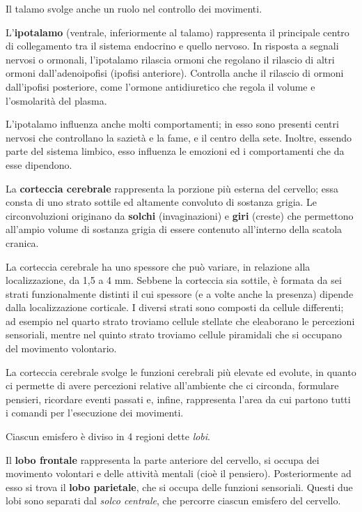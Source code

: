 \documentclass[]{article}
\begin{document}
Il talamo svolge anche un ruolo nel controllo dei movimenti.

L'\textbf{ipotalamo} (ventrale, inferiormente al talamo) rappresenta il
principale centro di collegamento tra il sistema endocrino e quello
nervoso. In risposta a segnali nervosi o ormonali, l'ipotalamo rilascia
ormoni che regolano il rilascio di altri ormoni dall'adenoipofisi
(ipofisi anteriore). Controlla anche il rilascio di ormoni dall'ipofisi
posteriore, come l'ormone antidiuretico che regola il volume e
l'osmolarità del plasma.

L'ipotalamo influenza anche molti comportamenti; in esso sono presenti
centri nervosi che controllano la sazietà e la fame, e il centro della
sete. Inoltre, essendo parte del sistema limbico, esso influenza le
emozioni ed i comportamenti che da esse dipendono.

La \textbf{corteccia cerebrale} rappresenta la porzione più esterna del
cervello; essa consta di uno strato sottile ed altamente convoluto di
sostanza grigia. Le circonvoluzioni originano da \textbf{solchi}
(invaginazioni) e \textbf{giri} (creste) che permettono all'ampio volume
di sostanza grigia di essere contenuto all'interno della scatola
cranica.

La corteccia cerebrale ha uno spessore che può variare, in relazione
alla localizzazione, da 1,5 a 4 mm. Sebbene la corteccia sia sottile, è
formata da sei strati funzionalmente distinti il cui spessore (e a volte
anche la presenza) dipende dalla localizzazione corticale. I diversi
strati sono composti da cellule differenti; ad esempio nel quarto strato
troviamo cellule stellate che eleaborano le percezioni sensoriali,
mentre nel quinto strato troviamo cellule piramidali che si occupano del
movimento volontario.

La corteccia cerebrale svolge le funzioni cerebrali più elevate ed
evolute, in quanto ci permette di avere percezioni relative all'ambiente
che ci circonda, formulare pensieri, ricordare eventi passati e, infine,
rappresenta l'area da cui partono tutti i comandi per l'esecuzione dei
movimenti.

Ciascun emisfero è diviso in 4 regioni dette \emph{lobi}.

Il \textbf{lobo frontale} rappresenta la parte anteriore del cervello,
si occupa dei movimento volontari e delle attività mentali (cioè il
pensiero). Posteriormente ad esso si trova il \textbf{lobo parietale},
che si occupa delle funzioni sensoriali. Questi due lobi sono separati
dal \emph{solco centrale}, che percorre ciascun emisfero del cervello.
\end{document}
